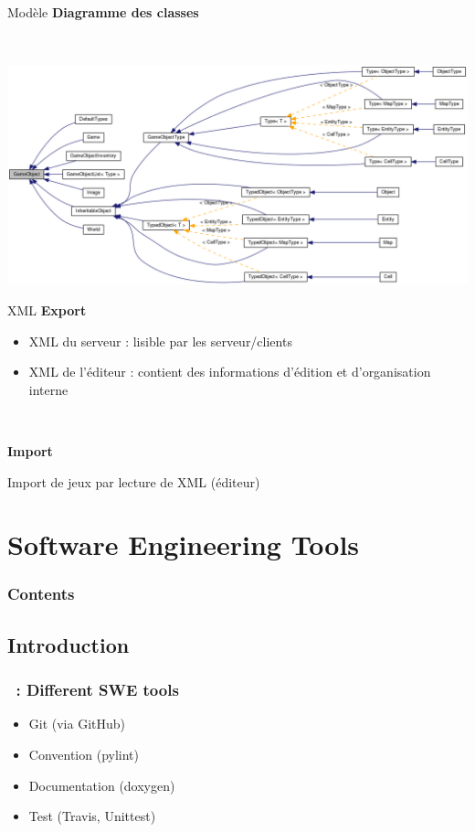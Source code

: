 \documentclass[11pt]{beamer}
\begin{document}
\begin{frame}{Modèle}
	\textbf{Diagramme des classes}
	
	~
	
	\begin{center}
		\includegraphics[scale=.24]{GameObject.png}
	\end{center}
\end{frame}


\begin{frame}{XML}
	\textbf{Export}
	\begin{itemize}
		\item XML du serveur : lisible par les serveur/clients
		\item XML de l'éditeur : contient des informations d'édition et d'organisation interne
	\end{itemize}
	
	~
	
	\textbf{Import}
	
	Import de jeux par lecture de XML (éditeur)
\end{frame}

\section{Software Engineering Tools}
 \begin{frame}
        \frametitle{Contents}
        \tableofcontents[currentsection]
    \end{frame}
\subsection{Introduction}

\begin{frame}
    \frametitle{\secname~: Different SWE tools}
    \begin{itemize}
        \item Git (via GitHub)
        \item Convention (pylint)
        \item Documentation (doxygen)
        \item Test (Travis, Unittest)
    \end{itemize}
\end{frame}
\end{document}
